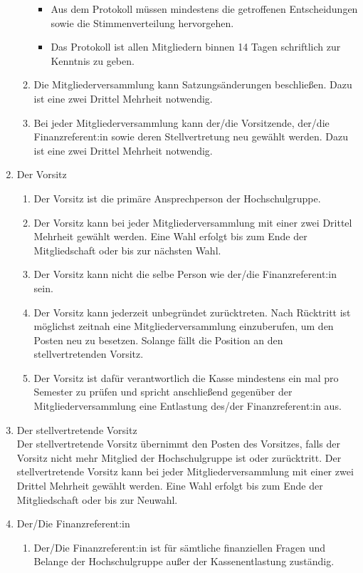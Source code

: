 \documentclass[11pt]{article}
\begin{document}
\begin{enumerate}
\begin{enumerate}
\begin{itemize}
                \item Aus dem Protokoll müssen mindestens die getroffenen Entscheidungen sowie die Stimmenverteilung hervorgehen.
                \item Das Protokoll ist allen Mitgliedern binnen 14 Tagen schriftlich zur Kenntnis zu geben.
            \end{itemize}
			\item Die Mitgliederversammlung kann Satzungsänderungen beschließen. Dazu ist eine zwei Drittel Mehrheit notwendig.
			\item Bei jeder Mitgliederversammlung kann der/die Vorsitzende, der/die Finanzreferent:in sowie deren Stellvertretung neu gewählt werden. Dazu ist eine zwei Drittel Mehrheit notwendig. 
		\end{enumerate}
		\item Der Vorsitz
		\begin{enumerate}
			\item Der Vorsitz ist die primäre Ansprechperson der Hochschulgruppe.
			\item Der Vorsitz kann bei jeder Mitgliederversammlung mit einer zwei Drittel Mehrheit gewählt werden. Eine Wahl erfolgt bis zum Ende der Mitgliedschaft oder bis zur nächsten Wahl.
			\item Der Vorsitz kann nicht die selbe Person wie der/die Finanzreferent:in sein.
			\item Der Vorsitz kann jederzeit unbegründet zurücktreten. Nach Rücktritt ist möglichst zeitnah eine Mitgliederversammlung einzuberufen, um den Posten neu zu besetzen. Solange fällt die Position an den stellvertretenden Vorsitz.
			\item Der Vorsitz ist dafür verantwortlich die Kasse mindestens ein mal pro Semester zu prüfen und spricht anschließend gegenüber der Mitgliederversammlung eine Entlastung des/der Finanzreferent:in aus.
		\end{enumerate}
		\item Der stellvertretende Vorsitz\\
			Der stellvertretende Vorsitz übernimmt den Posten des Vorsitzes, falls der Vorsitz nicht mehr Mitglied der Hochschulgruppe ist oder zurücktritt. Der stellvertretende Vorsitz kann bei jeder Mitgliederversammlung mit einer zwei Drittel Mehrheit gewählt werden. Eine Wahl erfolgt bis zum Ende der Mitgliedschaft oder bis zur Neuwahl.
		\item Der/Die Finanzreferent:in
		\begin{enumerate}
			\item Der/Die Finanzreferent:in ist für sämtliche finanziellen Fragen und Belange der Hochschulgruppe außer der Kassenentlastung zuständig.

\end{enumerate}
\end{enumerate}
\end{document}
